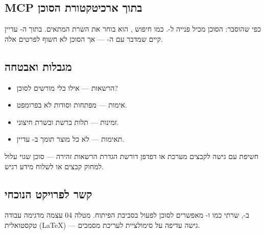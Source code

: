 \subsection{MCP בתוך ארכיטקטורת הסוכן}

כפי שהוסבר: הסוכן מכיל פנייה ל-. כמו חיפוש , הוא
בוחר את השרת המתאים. בתוך ה- עדיין קיים  שמדבר עם
ה- --- אך הסוכן לא חשוף לפרטים אלה.


\subsection{מגבלות ואבטחה}

\begin{itemize}[rightmargin=2em]
  \item הרשאות --- אילו כלי  מורשים לסוכן?
  \item אימות --- מפתחות  וסודות לא בפרומפט.
  \item זמינות --- תלות ברשת ובשרת חיצוני.
  \item תאימות --- לא כל מוצר תומך ב- עדיין.
\end{itemize}

\begin{warningbox}
חשיפת  עם גישה לקבצים מערכת או דפדפן דורשת הגדרת הרשאות
זהירה --- סוכן שגוי עלול למחוק קבצים או לשלוח מידע רגיש.
\end{warningbox}

\subsection{קשר לפרויקט הנוכחי}

ב-, שרתי  כמו  ו-
מאפשרים לסוכן לפעול בסביבת הפיתוח. מטלה 04 עצמה מדגימה עבודה טקסטואלית
(\LaTeX) --- גישה עדיפה על סימולציית  לעריכת מסמכים.
